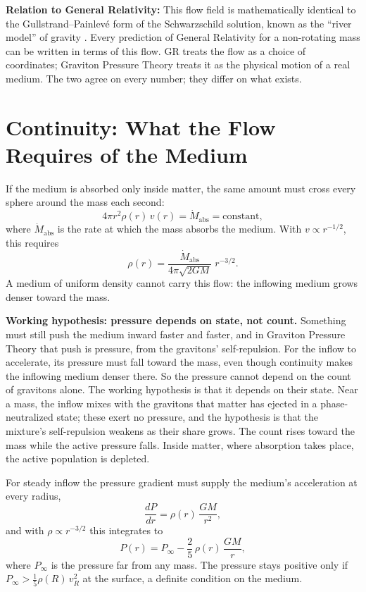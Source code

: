 \documentclass[11pt,a4paper]{article}
\begin{document}
\textbf{Relation to General Relativity:} This flow field is mathematically identical to the Gullstrand--Painlev\'e form of the Schwarzschild solution, known as the ``river model'' of gravity \cite{hamilton2008}. Every prediction of General Relativity for a non-rotating mass can be written in terms of this flow. GR treats the flow as a choice of coordinates; Graviton Pressure Theory treats it as the physical motion of a real medium. The two agree on every number; they differ on what exists.

\section{Continuity: What the Flow Requires of the Medium}
If the medium is absorbed only inside matter, the same amount must cross every sphere around the mass each second:
\begin{equation}
4\pi r^2 \rho(r)\, v(r) = \dot{M}_{\text{abs}} = \text{constant},
\end{equation}
where $\dot{M}_{\text{abs}}$ is the rate at which the mass absorbs the medium. With $v \propto r^{-1/2}$, this requires
\begin{equation}
\rho(r) = \frac{\dot{M}_{\text{abs}}}{4\pi\sqrt{2GM}}\; r^{-3/2}.
\end{equation}
A medium of uniform density cannot carry this flow: the inflowing medium grows denser toward the mass.

\textbf{Working hypothesis: pressure depends on state, not count.} Something must still push the medium inward faster and faster, and in Graviton Pressure Theory that push is pressure, from the gravitons' self-repulsion. For the inflow to accelerate, its pressure must fall toward the mass, even though continuity makes the inflowing medium denser there. So the pressure cannot depend on the count of gravitons alone. The working hypothesis is that it depends on their state. Near a mass, the inflow mixes with the gravitons that matter has ejected in a phase-neutralized state; these exert no pressure, and the hypothesis is that the mixture's self-repulsion weakens as their share grows. The count rises toward the mass while the active pressure falls. Inside matter, where absorption takes place, the active population is depleted.

For steady inflow the pressure gradient must supply the medium's acceleration at every radius,
\begin{equation}
\frac{dP}{dr} = \rho(r)\,\frac{GM}{r^2},
\end{equation}
and with $\rho \propto r^{-3/2}$ this integrates to
\begin{equation}
P(r) = P_\infty - \frac{2}{5}\,\rho(r)\,\frac{GM}{r},
\end{equation}
where $P_\infty$ is the pressure far from any mass. The pressure stays positive only if $P_\infty > \tfrac{1}{5}\rho(R)\,v_R^2$ at the surface, a definite condition on the medium.
\end{document}
